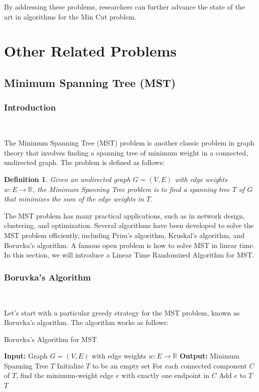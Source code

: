 \documentclass[11pt]{article}
\theoremstyle{plain}
\newtheorem{definition}{Definition}[section]
\begin{document}
By addressing these problems, researchers can further advance the state of the art in algorithms for the Min Cut problem.

\section{Other Related Problems}

\subsection{Minimum Spanning Tree (MST)}

\subsubsection{Introduction}\

The Minimum Spanning Tree (MST) problem is another classic problem in graph theory that involves finding a spanning tree of minimum weight in a connected, undirected graph. The problem is defined as follows:

\begin{definition}
    Given an undirected graph $G=(V,E)$ with edge weights $w:E\to \mathbb{R}$, the Minimum Spanning Tree problem is to find a spanning tree $T$ of $G$ that minimizes the sum of the edge weights in $T$.
\end{definition}

The MST problem has many practical applications, such as in network design, clustering, and optimization. Several algorithms have been developed to solve the MST problem efficiently, including Prim's algorithm, Kruskal's algorithm, and Boruvka's algorithm. A famous open problem is how to solve MST in linear time. In this section, we will introduce a Linear Time Randomized Algorithm for MST.

\subsubsection{Boruvka's Algorithm}\

Let's start with a particular greedy strategy for the MST problem, known as Boruvka's algorithm. The algorithm works as follows:
\newline
\begin{algorithm}
\caption{Boruvka's Algorithm for MST}
\label{alg:boruvka}
\begin{algorithmic}[1]
    \STATE \textbf{Input:} Graph $G=(V,E)$ with edge weights $w:E\to \mathbb{R}$
    \STATE \textbf{Output:} Minimum Spanning Tree $T$
    \STATE Initialize $T$ to be an empty set
        \STATE For each connected component $C$ of $T$, find the minimum-weight edge $e$ with exactly one endpoint in $C$
        \STATE Add $e$ to $T$
    \ENDWHILE
    \RETURN $T$
\end{algorithmic}
\end{algorithm}
\end{document}

